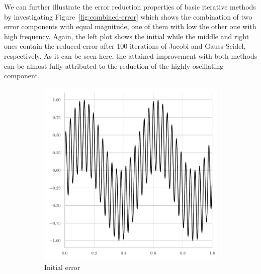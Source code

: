 We can further illustrate the error reduction properties of basic iterative methods by investigating Figure~\ref{fig:combined-error} which shows the combination of two error components with equal magnitude, one of them with low the other one with high frequency.
Again, the left plot shows the initial while the middle and right ones contain the reduced error after 100 iterations of Jacobi and Gauss-Seidel, respectively.
As it can be seen here, the attained improvement with both methods can be almost fully attributed to the reduction of the highly-oscillating component.
\begin{figure}
	\begin{subfigure}[b]{0.32\textwidth}
	\centering
		\includegraphics[width=\textwidth]{figures/error_plots//initial_error_jacobi_combined.pdf}
		\caption{Initial error}
\end{subfigure}
\hfill
\begin{subfigure}[b]{0.32\textwidth}
	\centering

\end{subfigure}
\end{figure}
